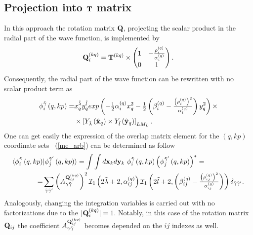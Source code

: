 \documentclass[
12pt, %
oneside, %
english, %
onehalfspacing, %
onehalfspacing, %
headsepline, %
]{MastersDoctoralThesis} %
\begin{document}
\subsection{Projection into ${\bf T}$ matrix}
\label{overlap_by_proj}
In this approach the rotation matrix ${\bf Q}$, projecting the scalar product in the radial part of the wave function, is implemented by
\begin{equation}
{\bf Q}_i^{(kq)}= {\bf T}^{(kq)} \times
\begin{pmatrix}
1 & -\tfrac{\rho^{(q)}_{i}}{\alpha^{(q)}_i} \\ 
0 & 1
\end{pmatrix} .
\end{equation}
Consequently, the radial part of the wave function can be rewritten with no scalar product term as
\begin{align}
\phi_{i}^{\tilde{\gamma} } \left(q, kp \right)  =  &
 x_{q}^{\tilde{\lambda}} y_{q}^{\tilde{l}} exp\left(- \tfrac{1}{2} \alpha^{(q)}_{i} x_{q}^{2} - \tfrac{1}{2} \left(  \beta^{(q)}_{i} - \tfrac{\left(\rho^{(q)}_i\right)^2}{\alpha^{(q)}_i} \right)  y_{q}^{2}  \right) 
\times  \nonumber \\ 
&\times  \left[ Y_{\tilde{\lambda}} \left(  \hat{ \bf x}_q \right) \times Y_{\tilde{l}} \left( \hat{\bf y}_q \right) \right]_{LM_L}.
\end{align}
One can get easily the expression of the overlap matrix element for the $(q,kp)$ coordinate sets ~(\ref{me_arb}) can be determined as follow
\begin{align}
\langle \phi_{i}^{\tilde{\gamma}}\left(q,kp \right) & \vert 
\phi_{j}^{\tilde{\gamma}^{\prime}}\left(q,kp \right) \rangle =
\int \int d{\bf x}_k d{\bf y}_k  ~\phi_{i}^{\tilde{\gamma}}\left(q,kp \right) \left( \phi_{j}^{\tilde{\gamma}^{\prime}}\left(q,kp \right) \right)^{*} =  \nonumber \\
=& \sum_{\tilde{\gamma}\tilde{\gamma}^{\prime}}  
\left( A_{\gamma\tilde{\gamma}}^{ {\bf Q}_{ij}^{(kq)} } \right)^2 
 \mathcal{I}_1 \left( 2 \tilde{\lambda}+2, \alpha^{(q)}_{ij} \right)
\mathcal{I}_1 \left( 2 \tilde{l}+2, \left(  \beta^{(q)}_{ij} - \tfrac{\left(\rho^{(q)}_{ij}\right)^2}{\alpha^{(q)}_{ij}} \right) \right)
  \delta_{\tilde{\gamma}\tilde{\gamma}^{\prime}}.
 \label{projectionMethod}
\end{align}
Analogously, changing the integration variables is carried out with no factorizations due to the $\vert {\bf Q}_i^{(kq)} \vert = 1$. Notably, in this case of  the rotation matrix ${\bf Q}_{ij}$  the coefficient $A_{\gamma\tilde{\gamma}}^{ {\bf Q}_{ij}^{(kq)} }$  becomes depended on the $ij$ indexes as well.
\end{document}
